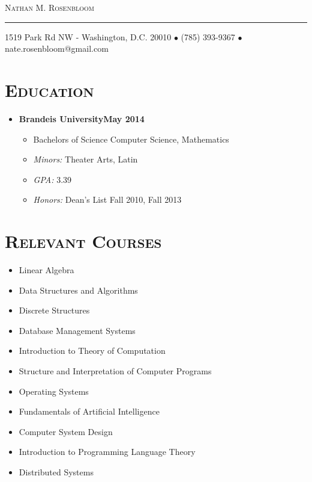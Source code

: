 \documentclass[10pt, oneside]{article}
\makeatletter
\newcommand{\lr}[2]{#1\hfill#2}
\newcommand{\name}{Nathan M. Rosenbloom}
\newcommand{\addr}{1519 Park Rd NW - Washington, D.C. 20010}
\newcommand{\phone}{(785) 393-9367}
\newcommand{\email}{nate.rosenbloom@gmail.com}
\newcommand{\resname}[4]{
  \begin{center}
    \selectfont\LARGE\scshape #1
    \normalfont
    \footnotesize
    \itshape
    \rule{\textwidth}{1pt}
    #2 $\bullet$ #3 $\bullet$ #4
    \normalfont
  \end{center}
}
\newcommand{\reseducation}[6]{
  \begin{ressection}{Education}
  \item[] \lr{\bfseries \selectfont #1\normalfont} {#2}
    \vspace{-8pt}
    \begin{itemize} \itemsep-2pt
    \item[] #4
    \item[] \textsl{Minors: }#5
    \item[] \textsl{GPA: }#3
    \item[] \textsl{Honors: }#6
    \end{itemize}
  \end{ressection}
}
\newenvironment{ressection}[1]{
  \section{\normalsize \scshape \selectfont #1 \normalfont}
  \vspace{-4pt}
  \begin{itemize} \itemsep-2pt
  }{
  \end{itemize}
  \vspace{-20pt}
}
\newenvironment{resclasses}
{
  \section{\normalsize \scshape \selectfont Relevant Courses \normalfont}
  \normalfont
  \vspace{-12pt}
  \begin{flushleft}
  \begin{multicols}{3}
    \begin{itemize} \itemsep -3pt
      }{
      \end{itemize}
    \end{multicols}
    \end{flushleft}
  \vspace{-20pt}
}
\makeatother
\begin{document}
\resname{\name}{\addr}{\phone}{\email}
\setcounter{secnumdepth}{-1} %
 
\reseducation{Brandeis University}{May 2014}{3.39}{Bachelors of Science Computer Science, Mathematics}{Theater Arts, Latin}{Dean's List Fall 2010, Fall 2013}
\begin{resclasses}
\item Linear Algebra
\item Data Structures and Algorithms
\item Discrete Structures
\item Database Management Systems
\item Introduction to Theory of Computation
\item Structure and Interpretation of Computer Programs
\item Operating Systems
\item Fundamentals of Artificial Intelligence
\item Computer System Design
\item Introduction to Programming Language Theory
\item Distributed Systems
\end{resclasses}
\end{document}
